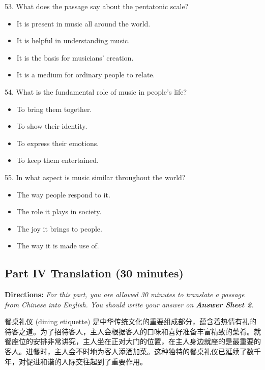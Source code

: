 \documentclass[UTF8,11pt]{ctexart}
\begin{document}
53. What does the passage say about the pentatonic scale?


\begin{itemize}[leftmargin=2em,itemsep=.2em,topsep=.4em]\item[A.] It is present in music all around the world.
\item[B.] It is helpful in understanding music.
\item[C.] It is the basis for musicians’ creation.
\item[D.] It is a medium for ordinary people to relate.
\end{itemize}

54. What is the fundamental role of music in people’s life?


\begin{itemize}[leftmargin=2em,itemsep=.2em,topsep=.4em]\item[A.] To bring them together.
\item[B.] To show their identity.
\item[C.] To express their emotions.
\item[D.] To keep them entertained.
\end{itemize}

55. In what aspect is music similar throughout the world?


\begin{itemize}[leftmargin=2em,itemsep=.2em,topsep=.4em]\item[A.] The way people respond to it.
\item[B.] The role it plays in society.
\item[C.] The joy it brings to people.
\item[D.] The way it is made use of.
\end{itemize}

\subsection*{\textbf{Part IV Translation (30 minutes)}}


\textbf{Directions: }\textit{For this part, you are allowed 30 minutes to translate a passage from Chinese into English. You should} \textit{write your answer on }\textbf{\textit{Answer Sheet 2}}\textit{.}


餐桌礼仪 (dining etiquette) 是中华传统文化的重要组成部分，蕴含着热情有礼的待客之道。为了招待客人，主人会根据客人的口味和喜好准备丰富精致的菜肴。就餐座位的安排非常讲究，主人坐在正对大门的位置，在主人身边就座的是最重要的客人。进餐时，主人会不时地为客人添酒加菜。这种独特的餐桌礼仪已延续了数千年，对促进和谐的人际交往起到了重要作用。
\end{document}
